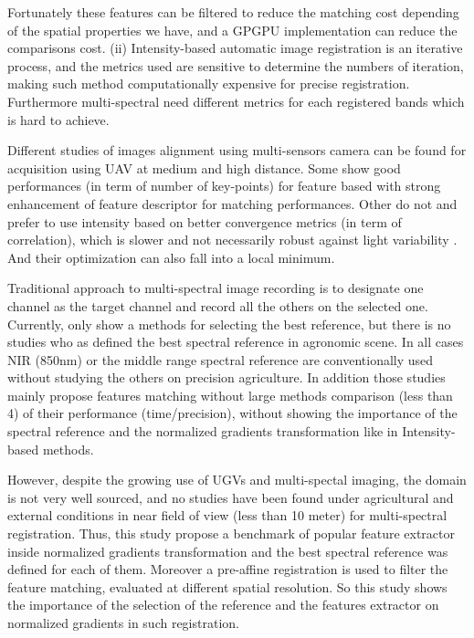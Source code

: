 \documentclass[]{elsarticle}
\begin{document}
	Fortunately these features can be filtered to reduce the matching cost depending of the spatial properties we have, and a GPGPU implementation can reduce the comparisons cost.
	(ii) Intensity-based automatic image registration is an iterative process, and the metrics used are sensitive to determine the numbers of iteration,
	making such method computationally expensive for precise registration. Furthermore multi-spectral need different metrics for each registered bands which is hard to achieve.
	\\
	\par Different studies of images alignment using multi-sensors camera can be found for acquisition using UAV at medium and high distance.
	Some show good performances (in term of number of key-points) for feature based \cite{DantasDiasJunior, Vakalopoulou} with strong enhancement of feature descriptor for matching performances.
	Other do not and prefer to use intensity based \cite{douarre:hal-02183837} on better convergence metrics \cite{8118101} (in term of correlation),
	which is slower and not necessarily robust against light variability \cite{Vioix2004ConceptionER}.
	And their optimization can also fall into a local minimum.
	\\
	\par Traditional approach to multi-spectral image recording is to designate one channel as the target channel and record all the others on the selected one.
	Currently, only \cite{DantasDiasJunior} show a methods for selecting the best reference, but there is no studies who as defined the best spectral reference in agronomic scene.
	In all cases NIR (850nm) or the middle range spectral reference are conventionally used without studying the others on precision agriculture.
	In addition those studies mainly propose features matching without large methods comparison \cite{DantasDiasJunior}(less than 4) of their performance (time/precision),
	without showing the importance of the spectral reference and the normalized gradients transformation like in Intensity-based methods.
	\\
	\par However, despite the growing use of UGVs and multi-spectal imaging, the domain is not very well sourced,
	and no studies have been found under agricultural and external conditions in near field of view (less than 10 meter) for multi-spectral registration.
	Thus, this study propose a benchmark of popular feature extractor inside normalized gradients transformation and the best spectral reference was defined for each of them.
	Moreover a pre-affine registration is used to filter the feature matching, evaluated at different spatial resolution.
	So this study shows the importance of the selection of the reference and the features extractor on normalized gradients in such registration.
	
\end{document}
